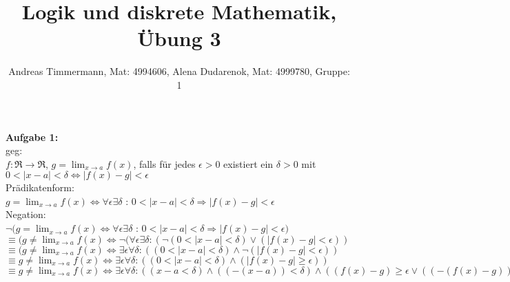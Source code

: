 \documentclass[a4paper]{scrartcl}
\title{Logik und diskrete Mathematik, Übung 3}
\author{Andreas Timmermann, Mat: 4994606, Alena Dudarenok, Mat: 4999780, Gruppe: 1}
\begin{document}
	\maketitle
	\begin{flushleft}
		\textbf{Aufgabe 1:}\\
		geg: \\
		$f:\Re\rightarrow\Re$, $g=\lim_{x\rightarrow a}f(x)$, falls für jedes $\epsilon>0$ existiert ein $\delta>0$ mit $0<\mid x-a\mid<\delta \Leftrightarrow \mid f(x)-g\mid<\epsilon$\\[1em]
		Prädikatenform:\\
		$g=\lim_{x\rightarrow a}f(x)\Leftrightarrow \forall\epsilon\exists\delta$ : $0<\mid x-a\mid<\delta \Rightarrow \mid f(x)-g\mid<\epsilon$\\
		Negation:\\
		$\neg(g=\lim_{x\rightarrow a}f(x)\Leftrightarrow \forall\epsilon\exists\delta $ : $0<\mid x-a\mid<\delta \Rightarrow \mid f(x)-g\mid<\epsilon)$\\
		$\equiv (g\neq\lim_{x\rightarrow a}f(x)\Leftrightarrow \neg(\forall\epsilon\exists\delta : (\neg(0<\mid x-a\mid<\delta) \vee (\mid f(x)-g\mid<\epsilon))$\\
		$\equiv (g\neq\lim_{x\rightarrow a}f(x)\Leftrightarrow \exists\epsilon\forall\delta:((0<\mid x-a\mid<\delta) \wedge \neg(\mid f(x)-g\mid<\epsilon))$\\
		$\equiv g\neq\lim_{x\rightarrow a}f(x)\Leftrightarrow \exists\epsilon\forall\delta:((0<\mid x-a\mid<\delta) \wedge (\mid f(x)-g\mid\geq\epsilon))$\\
		$\equiv g\neq\lim_{x\rightarrow a}f(x)\Leftrightarrow \exists\epsilon\forall\delta:((x-a<\delta) \wedge ((-(x-a))<\delta)  \wedge ((f(x)-g)\geq\epsilon \vee ((-(f(x)-g))\geq\epsilon)))$\\
	\end{flushleft}
\end{document}
